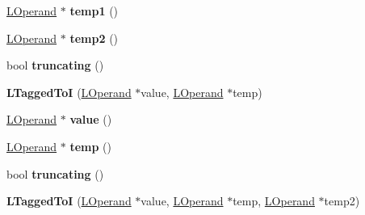 \begin{DoxyCompactItemize}
\item 
\hyperlink{classv8_1_1internal_1_1_l_operand}{L\+Operand} $\ast$ {\bfseries temp1} ()\hypertarget{classv8_1_1internal_1_1_l_tagged_to_i_a979fc16cb97a6f8ab260b34b70a14f6e}{}\label{classv8_1_1internal_1_1_l_tagged_to_i_a979fc16cb97a6f8ab260b34b70a14f6e}

\item 
\hyperlink{classv8_1_1internal_1_1_l_operand}{L\+Operand} $\ast$ {\bfseries temp2} ()\hypertarget{classv8_1_1internal_1_1_l_tagged_to_i_a379b9f67eadcfd31650957f0d0c686a8}{}\label{classv8_1_1internal_1_1_l_tagged_to_i_a379b9f67eadcfd31650957f0d0c686a8}

\item 
bool {\bfseries truncating} ()\hypertarget{classv8_1_1internal_1_1_l_tagged_to_i_abb946d8222ed5fd6b32d2f5f99cbe24b}{}\label{classv8_1_1internal_1_1_l_tagged_to_i_abb946d8222ed5fd6b32d2f5f99cbe24b}

\item 
{\bfseries L\+Tagged\+ToI} (\hyperlink{classv8_1_1internal_1_1_l_operand}{L\+Operand} $\ast$value, \hyperlink{classv8_1_1internal_1_1_l_operand}{L\+Operand} $\ast$temp)\hypertarget{classv8_1_1internal_1_1_l_tagged_to_i_a60669616def0fe3272b586e94e09d5a6}{}\label{classv8_1_1internal_1_1_l_tagged_to_i_a60669616def0fe3272b586e94e09d5a6}

\item 
\hyperlink{classv8_1_1internal_1_1_l_operand}{L\+Operand} $\ast$ {\bfseries value} ()\hypertarget{classv8_1_1internal_1_1_l_tagged_to_i_af847eb991b1b476ad690972a7266618d}{}\label{classv8_1_1internal_1_1_l_tagged_to_i_af847eb991b1b476ad690972a7266618d}

\item 
\hyperlink{classv8_1_1internal_1_1_l_operand}{L\+Operand} $\ast$ {\bfseries temp} ()\hypertarget{classv8_1_1internal_1_1_l_tagged_to_i_adc8b5fff519135913c9d0104c2fc6846}{}\label{classv8_1_1internal_1_1_l_tagged_to_i_adc8b5fff519135913c9d0104c2fc6846}

\item 
bool {\bfseries truncating} ()\hypertarget{classv8_1_1internal_1_1_l_tagged_to_i_abb946d8222ed5fd6b32d2f5f99cbe24b}{}\label{classv8_1_1internal_1_1_l_tagged_to_i_abb946d8222ed5fd6b32d2f5f99cbe24b}

\item 
{\bfseries L\+Tagged\+ToI} (\hyperlink{classv8_1_1internal_1_1_l_operand}{L\+Operand} $\ast$value, \hyperlink{classv8_1_1internal_1_1_l_operand}{L\+Operand} $\ast$temp, \hyperlink{classv8_1_1internal_1_1_l_operand}{L\+Operand} $\ast$temp2)\hypertarget{classv8_1_1internal_1_1_l_tagged_to_i_afacde0d4471ca6d7246bf7ea8e226f33}{}\label{classv8_1_1internal_1_1_l_tagged_to_i_afacde0d4471ca6d7246bf7ea8e226f33}


\end{DoxyCompactItemize}
